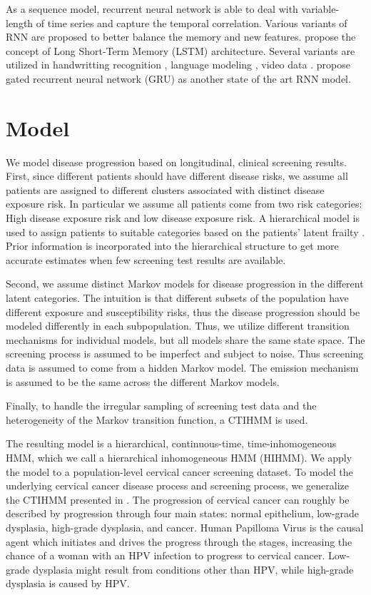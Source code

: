 \documentclass{article}
\begin{document}
As a sequence model, recurrent neural network is able to deal with variable-length of time series and capture the temporal correlation. Various variants of RNN are proposed to better balance the memory and new features. \cite{Hochreiter_1997, Cho_2014} propose the concept of Long Short-Term Memory (LSTM) architecture. Several variants are utilized in handwritting recognition \citep{Doestsch_2014} , language modeling \citep{Stephen_2017}, video data \citep{Zhang_2016}. \cite{Chung_2014} propose gated recurrent neural network (GRU) as another state of the art RNN model.

\section{Model}
We model disease progression based on longitudinal, clinical screening results. First, since different patients should have different disease risks, we assume all patients are assigned to different clusters associated with distinct disease exposure risk. In particular we assume all patients come from two risk categories: High disease exposure risk and low disease exposure risk. A hierarchical model is used to  assign patients to suitable categories based on the patients' latent frailty \cite{Amy2010}.  Prior information is incorporated into the hierarchical structure to get more accurate estimates  when few screening test results are available.

Second, we assume distinct Markov models for disease progression in the different latent categories. The intuition is that different subsets of the population have different exposure and susceptibility risks, thus the disease progression should be modeled differently in each subpopulation.
Thus, we utilize different transition mechanisms for individual models, but all models share the same state space. The screening process is assumed to be imperfect and subject to noise. Thus screening data is assumed to come from a hidden Markov model.  The emission mechanism is assumed to be the same across the different Markov models. 

Finally, to handle the irregular sampling of screening test data and the heterogeneity of the Markov transition function, a CTIHMM is used. 

The resulting model is a hierarchical, continuous-time, time-inhomogeneous HMM, which we call a hierarchical inhomogeneous HMM (HIHMM). We apply the model to a population-level cervical cancer screening dataset.  To model the underlying cervical cancer disease process and screening process, we generalize the CTIHMM presented in \cite{Soper_et_al_2018}.  The progression of cervical cancer can roughly be described by progression through four main states: normal epithelium, low-grade dysplasia, high-grade dysplasia, and cancer.  Human Papilloma Virus is the causal agent which initiates and drives the progress through the stages,  increasing the chance of a woman with an HPV infection to progress to cervical cancer.  Low-grade dysplasia might result from conditions other than HPV, while high-grade dysplasia is caused by HPV.
\end{document}
